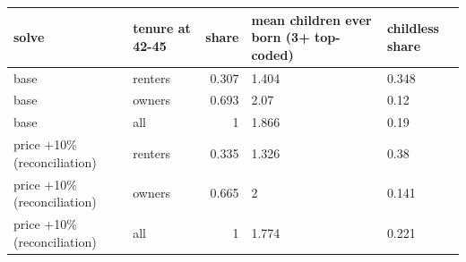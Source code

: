 \begingroup\small
\setlength{\tabcolsep}{3pt}
\renewcommand{\arraystretch}{1.04}
\begin{tabularx}{\linewidth}{XXrXX}
\toprule
solve & tenure at 42-45 & share & mean children ever born (3+ top-coded) & childless share \\
\midrule
base & renters & 0.307 & 1.404 & 0.348 \\
base & owners & 0.693 & 2.07 & 0.12 \\
base & all & 1 & 1.866 & 0.19 \\
price +10\% (reconciliation) & renters & 0.335 & 1.326 & 0.38 \\
price +10\% (reconciliation) & owners & 0.665 & 2 & 0.141 \\
price +10\% (reconciliation) & all & 1 & 1.774 & 0.221 \\
\bottomrule
\end{tabularx}
\endgroup
